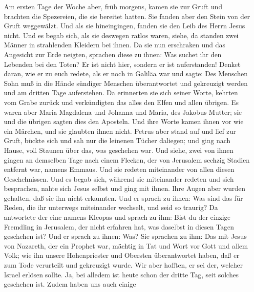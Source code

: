  Am ersten Tage der Woche aber, früh morgens, kamen sie
zur Gruft und brachten die Spezereien, die sie bereitet hatten.
 Sie fanden aber den Stein von der Gruft weggewälzt.
 Und als sie hineingingen, fanden sie den Leib des Herrn
Jesus nicht.  Und es begab sich, als sie deswegen ratlos
waren, siehe, da standen zwei Männer in strahlenden Kleidern bei ihnen.
 Da sie nun erschraken und das Angesicht zur Erde neigten,
sprachen diese zu ihnen: Was suchet ihr den Lebenden bei den Toten?
 Er ist nicht hier, sondern er ist auferstanden! Denket
daran, wie er zu euch redete, als er noch in Galiläa war 
und sagte: Des Menschen Sohn muß in die Hände sündiger Menschen
überantwortet und gekreuzigt werden und am dritten Tage auferstehen.
 Da erinnerten sie sich seiner Worte, 
kehrten vom Grabe zurück und verkündigten das alles den Elfen und allen
übrigen.  Es waren aber Maria Magdalena und Johanna und
Maria, des Jakobus Mutter; sie und die übrigen sagten dies den Aposteln.
 Und ihre Worte kamen ihnen vor wie ein Märchen, und sie
glaubten ihnen nicht.  Petrus aber stand auf und lief zur
Gruft, bückte sich und sah nur die leinenen Tücher daliegen; und ging
nach Hause, voll Staunen über das, was geschehen war. 
Und siehe, zwei von ihnen gingen an demselben Tage nach einem Flecken,
der von Jerusalem sechzig Stadien entfernt war, namens Emmaus.
 Und sie redeten miteinander von allen diesen
Geschehnissen.  Und es begab sich, während sie
miteinander redeten und sich besprachen, nahte sich Jesus selbst und
ging mit ihnen.  Ihre Augen aber wurden gehalten, daß sie
ihn nicht erkannten.  Und er sprach zu ihnen: Was sind
das für Reden, die ihr unterwegs miteinander wechselt, und seid so
traurig?  Da antwortete der eine namens Kleopas und
sprach zu ihm: Bist du der einzige Fremdling in Jerusalem, der nicht
erfahren hat, was daselbst in diesen Tagen geschehen ist?
 Und er sprach zu ihnen: Was? Sie sprachen zu ihm: Das
mit Jesus von Nazareth, der ein Prophet war, mächtig in Tat und Wort vor
Gott und allem Volk;  wie ihn unsere Hohenpriester und
Obersten überantwortet haben, daß er zum Tode verurteilt und gekreuzigt
wurde.  Wir aber hofften, er sei der, welcher Israel
erlösen sollte. Ja, bei alledem ist heute schon der dritte Tag, seit
solches geschehen ist.  Zudem haben uns auch einige
